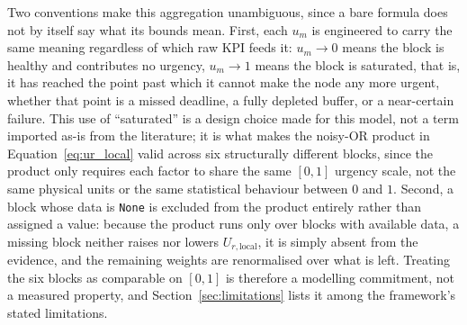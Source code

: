 
Two conventions make this aggregation unambiguous, since a bare formula does not by itself say what its bounds mean. First, each $u_m$ is engineered to carry the same meaning regardless of which raw KPI feeds it: $u_m \to 0$ means the block is healthy and contributes no urgency, $u_m \to 1$ means the block is saturated, that is, it has reached the point past which it cannot make the node any more urgent, whether that point is a missed deadline, a fully depleted buffer, or a near-certain failure. This use of ``saturated'' is a design choice made for this model, not a term imported as-is from the literature; it is what makes the noisy-OR product in Equation~\ref{eq:ur_local} valid across six structurally different blocks, since the product only requires each factor to share the same $[0,1]$ urgency scale, not the same physical units or the same statistical behaviour between $0$ and $1$. Second, a block whose data is \texttt{None} is excluded from the product entirely rather than assigned a value: because the product runs only over blocks with available data, a missing block neither raises nor lowers $U_{r,\text{local}}$, it is simply absent from the evidence, and the remaining weights are renormalised over what is left. Treating the six blocks as comparable on $[0,1]$ is therefore a modelling commitment, not a measured property, and Section~\ref{sec:limitations} lists it among the framework's stated limitations.

